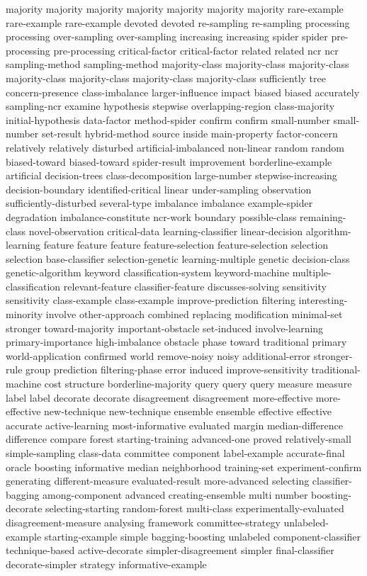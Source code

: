 majority	majority	majority	majority	majority	majority	majority	
rare-example	rare-example	rare-example	
devoted	devoted	
re-sampling	re-sampling	
processing	processing	
over-sampling	over-sampling	
increasing	increasing	
spider	spider	
pre-processing	pre-processing	
critical-factor	critical-factor	
related	related	
ncr	ncr	
sampling-method	sampling-method	
majority-class	majority-class	majority-class	majority-class	majority-class	majority-class	majority-class	
sufficiently	
tree	
concern-presence	
class-imbalance	
larger-influence	
impact	
biased	biased	
accurately	
sampling-ncr	
examine	
hypothesis	
stepwise	
overlapping-region	
class-majority	
initial-hypothesis	
data-factor	
method-spider	
confirm	confirm	
small-number	small-number	
set-result	
hybrid-method	
source	
inside	
main-property	
factor-concern	
relatively	relatively	
disturbed	
artificial-imbalanced	
non-linear	
random	random	
biased-toward	biased-toward	
spider-result	
improvement	
borderline-example	
artificial	
decision-trees	
class-decomposition	
large-number	
stepwise-increasing	
decision-boundary	
identified-critical	
linear	
under-sampling	
observation	
sufficiently-disturbed	
several-type	
imbalance	imbalance	
example-spider	
degradation	
imbalance-constitute	
ncr-work	
boundary	
possible-class	
remaining-class	
novel-observation	
critical-data	
learning-classifier	
linear-decision	
algorithm-learning	
feature	feature	feature	
feature-selection	feature-selection	
selection	selection	
base-classifier	
selection-genetic	
learning-multiple	
genetic	
decision-class	
genetic-algorithm	
keyword	
classification-system	
keyword-machine	
multiple-classification	
relevant-feature	
classifier-feature	
discusses-solving	
sensitivity	sensitivity	
class-example	class-example	
improve-prediction	
filtering	
interesting-minority	
involve	
other-approach	
combined	
replacing	
modification	
minimal-set	
stronger	
toward-majority	
important-obstacle	
set-induced	
involve-learning	
primary-importance	
high-imbalance	
obstacle	
phase	
toward	
traditional	
primary	
world-application	
confirmed	
world	
remove-noisy	
noisy	
additional-error	
stronger-rule	
group	
prediction	
filtering-phase	
error	
induced	
improve-sensitivity	
traditional-machine	
cost	
structure	
borderline-majority	
query	query	query	
measure	measure	
label	label	
decorate	decorate	
disagreement	disagreement	
more-effective	more-effective	
new-technique	new-technique	
ensemble	ensemble	
effective	effective	
accurate	
active-learning	
most-informative	
evaluated	
margin	
median-difference	
difference	
compare	
forest	
starting-training	
advanced-one	
proved	
relatively-small	
simple-sampling	
class-data	
committee	
component	
label-example	
accurate-final	
oracle	
boosting	
informative	
median	
neighborhood	
training-set	
experiment-confirm	
generating	
different-measure	
evaluated-result	
more-advanced	
selecting	
classifier-bagging	
among-component	
advanced	
creating-ensemble	
multi	
number	
boosting-decorate	
selecting-starting	
random-forest	
multi-class	
experimentally-evaluated	
disagreement-measure	
analysing	
framework	
committee-strategy	
unlabeled-example	
starting-example	
simple	
bagging-boosting	
unlabeled	
component-classifier	
technique-based	
active-decorate	
simpler-disagreement	
simpler	
final-classifier	
decorate-simpler	
strategy	
informative-example	
